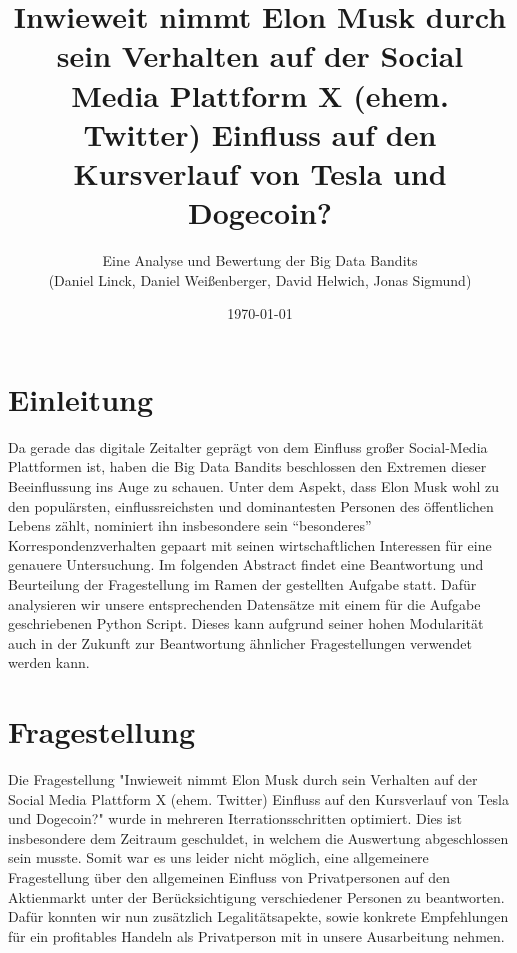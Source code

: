 \documentclass{article}
\title{\textbf {Inwieweit nimmt Elon Musk durch sein Verhalten auf der Social Media Plattform X (ehem. Twitter) Einfluss auf den Kursverlauf von Tesla und Dogecoin?}}
\author{Eine Analyse und Bewertung der Big Data Bandits \\ (Daniel Linck, Daniel Weißenberger, David Helwich, Jonas Sigmund)}
\date{\today}
\begin{document}
\maketitle

\tableofcontents

\section{Einleitung}
Da gerade das digitale Zeitalter geprägt von dem Einfluss großer Social-Media Plattformen ist, haben die Big Data Bandits beschlossen den Extremen dieser Beeinflussung ins Auge zu schauen.
Unter dem Aspekt, dass Elon Musk wohl zu den populärsten, einflussreichsten und dominantesten Personen des öffentlichen Lebens zählt, nominiert ihn insbesondere sein ``besonderes'' Korrespondenzverhalten gepaart mit seinen wirtschaftlichen Interessen für eine genauere Untersuchung.
Im folgenden Abstract findet eine Beantwortung und Beurteilung der Fragestellung im Ramen der gestellten Aufgabe statt.
Dafür analysieren wir unsere entsprechenden Datensätze mit einem für die Aufgabe geschriebenen Python Script.
Dieses kann aufgrund seiner hohen Modularität auch in der Zukunft zur Beantwortung ähnlicher Fragestellungen verwendet werden kann.
\newpage

\section{Fragestellung}
Die Fragestellung "Inwieweit nimmt Elon Musk durch sein Verhalten auf der Social Media Plattform X (ehem. Twitter) Einfluss auf den Kursverlauf von Tesla und Dogecoin?" wurde in mehreren Iterrationsschritten optimiert. 
Dies ist insbesondere dem Zeitraum geschuldet, in welchem die Auswertung abgeschlossen sein musste.
Somit war es uns leider nicht möglich, eine allgemeinere Fragestellung über den allgemeinen Einfluss von Privatpersonen auf den Aktienmarkt unter der Berücksichtigung verschiedener Personen zu beantworten.
Dafür konnten wir nun zusätzlich Legalitätsapekte, sowie konkrete Empfehlungen für ein profitables Handeln als Privatperson mit in unsere Ausarbeitung nehmen.
\end{document}
